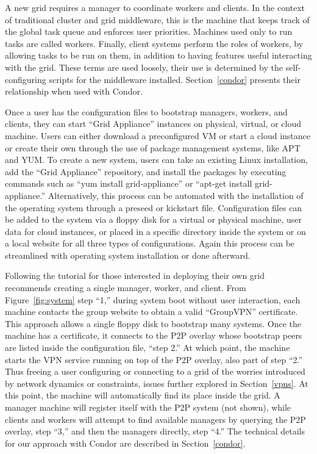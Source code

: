 \documentclass[conference]{IEEEtran}
\begin{document}
A new grid requires a manager to coordinate workers and clients.  In the
context of traditional cluster and grid middleware, this is the machine that
keeps track of the global task queue and enforces user priorities.  Machines
used only to run tasks are called workers.  Finally, client systems perform the
roles of workers, by allowing tasks to be run on them, in addition to having
features useful interacting with the grid.  These terms are used loosely, their
use is determined by the self-configuring scripts for the middleware installed.
Section~\ref{condor} presents their relationship when used with Condor.

Once a user has the configuration files to bootstrap managers, workers, and
clients, they can start ``Grid Appliance'' instances  on physical, virtual, or
cloud machine.  Users can either download a preconfigured VM or start a cloud
instance or create their own through the use of package management systems,
like APT and YUM.  To create a new system, users can take an existing Linux
installation, add the ``Grid Appliance'' repository, and install the packages
by executing commands such as ``yum install grid-appliance'' or ``apt-get
install grid-appliance.'' Alternatively, this process can be automated with the
installation of the operating system through a preseed or kickstart file.
Configuration files can be added to the system via a floppy disk for a virtual
or physical machine, user data for cloud instances, or placed in a specific
directory inside the system or on a local website for all three types of
configurations.  Again this process can be streamlined with operating system
installation or done afterward.  
 
Following the tutorial for those interested in deploying their own grid
recommends creating a single manager, worker, and client.  From
Figure~\ref{fig:system} step ``1,'' during system boot without user
interaction, each machine contacts the group website to obtain a valid
``GroupVPN'' certificate.  This approach allows a single floppy disk to
bootstrap many systems.  Once the machine has a certificate, it connects to the
P2P overlay whose bootstrap peers are listed inside the configuration file,
``step 2.''  At which point, the machine starts the VPN service running on top
of the P2P overlay, also part of step ``2.'' Thus freeing a user configuring or
connecting to a grid of the worries introduced by network dynamics or
constraints, issues further explored in Section~\ref{vpns}.  At this point, the
machine will automatically find its place inside the grid.  A manager machine
will register itself with the P2P system (not shown), while clients and workers
will attempt to find available managers by querying the P2P overlay, step
``3,'' and then the managers directly, step ``4.''  The technical details for
our approach with Condor are described in Section~\ref{condor}.
\end{document}
